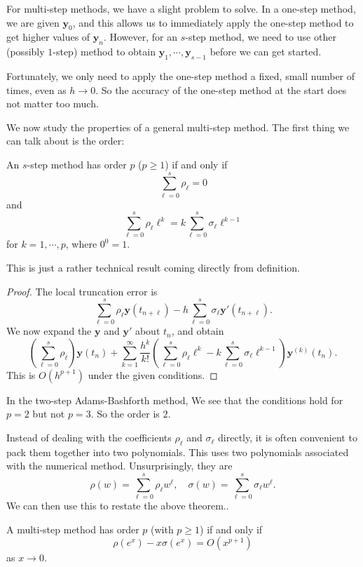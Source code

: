\documentclass[a4paper]{article}
\begin{document}
For multi-step methods, we have a slight problem to solve. In a one-step method, we are given $\mathbf{y}_0$, and this allows us to immediately apply the one-step method to get higher values of $\mathbf{y}_n$. However, for an $s$-step method, we need to use other (possibly $1$-step) method to obtain $\mathbf{y}_1, \cdots, \mathbf{y}_{s - 1}$ before we can get started.

Fortunately, we only need to apply the one-step method a fixed, small number of times, even as $h \to 0$. So the accuracy of the one-step method at the start does not matter too much.

We now study the properties of a general multi-step method. The first thing we can talk about is the order:
\begin{thm}
  An $s$-step method has order $p$ ($p \geq 1$) if and only if
  \[
    \sum_{\ell = 0}^s \rho_\ell = 0
  \]
  and
  \[
    \sum_{\ell = 0}^s \rho_\ell \ell^k = k\sum_{\ell = 0}^s \sigma_\ell \ell^{k - 1}
  \]
  for $k = 1, \cdots, p$, where $0^0 = 1$.
\end{thm}

This is just a rather technical result coming directly from definition.
\begin{proof}
  The local truncation error is
  \[
    \sum_{\ell = 0}^s \rho_\ell \mathbf{y}(t_{n + \ell}) - h \sum_{\ell = 0}^s \sigma_\ell \mathbf{y}'(t_{n + \ell}).
  \]
  We now expand the $\mathbf{y}$ and $\mathbf{y}'$ about $t_n$, and obtain
  \[
    \left(\sum_{\ell = 0}^s \rho_\ell\right) \mathbf{y}(t_n) + \sum_{k = 1}^\infty \frac{h^k}{k!}\left(\sum_{\ell = 0}^s \rho_\ell \ell^k - k \sum_{\ell = 0}^s \sigma_\ell \ell^{k - 1}\right)\mathbf{y}^{(k)}(t_n).
  \]
  This is $O(h^{p + 1})$ under the given conditions.
\end{proof}

\begin{eg}[AB2]
  In the two-step Adams-Bashforth method, We see that the conditions hold for $p = 2$ but not $p = 3$. So the order is $2$.
\end{eg}

Instead of dealing with the coefficients $\rho_\ell$ and $\sigma_\ell$ directly, it is often convenient to pack them together into two polynomials. This uses two polynomials associated with the numerical method. Unsurprisingly, they are
\[
  \rho(w) = \sum_{\ell = 0}^s \rho_\ell w^\ell,\quad \sigma(w) = \sum_{\ell = 0}^s \sigma_\ell w^\ell.
\]
We can then use this to restate the above theorem..
\begin{thm}
  A multi-step method has order $p$ (with $p \geq 1$) if and only if
  \[
    \rho(e^x) - x \sigma(e^x) = O(x^{p + 1})
  \]
  as $x \to 0$.
\end{thm}
\end{document}
